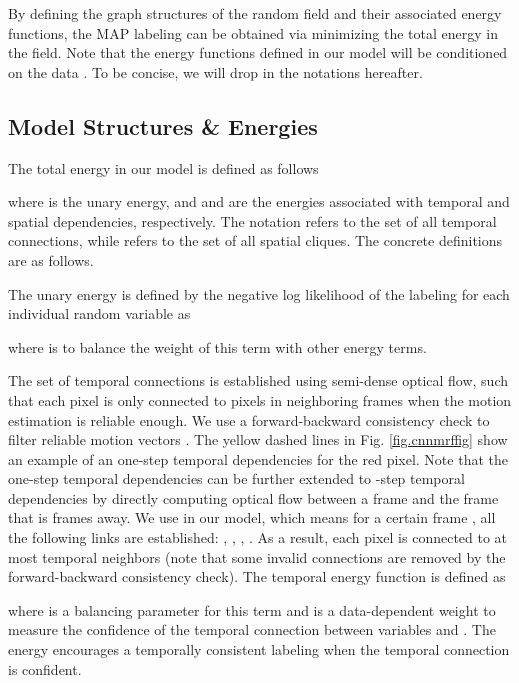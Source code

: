 \documentclass[10pt,twocolumn,letterpaper]{article}
\begin{document}
By defining the graph structures of the random field and their associated energy functions,
the MAP labeling can be obtained via minimizing the total energy in the field.
Note that the energy functions defined in our model will be conditioned on the data .
To be concise, we will drop  in the notations hereafter.




\subsection{Model Structures \& Energies}

The total energy in our model is defined as follows

where  is the unary energy, and  and  are the energies associated with temporal and spatial dependencies, respectively.
The notation  refers to the set of all temporal connections,
while  refers to the set of all spatial cliques.
The concrete definitions are as follows.

The unary energy is defined by the negative log likelihood of the labeling for each individual random variable as

where  is to balance the weight of this term with other energy terms.

The set of temporal connections  is established using semi-dense optical flow, such that each pixel is only connected
to pixels in neighboring frames when the motion estimation is reliable enough.
We use a forward-backward consistency check to filter reliable motion vectors \cite{bao2014cvpreppm,bao2014fast,jiang2012trajectory,jiang2015human}.
The yellow dashed lines in Fig. \ref{fig.cnnmrffig} show an example of an one-step temporal dependencies for the red pixel.
Note that the one-step temporal dependencies can be further extended to -step temporal dependencies by directly computing
optical flow between a frame and the frame that is  frames away. We use   in our model,
which means for a certain frame , all the following links are established:
, , , .
As a result, each pixel is connected to at most  temporal neighbors (note that some invalid connections are removed by the forward-backward consistency check).
The temporal energy function is defined as

where  is a balancing parameter for this term
and  is a data-dependent weight to measure the confidence of the temporal connection between variables  and .
The energy encourages a temporally consistent labeling when the temporal connection is confident.
\end{document}
